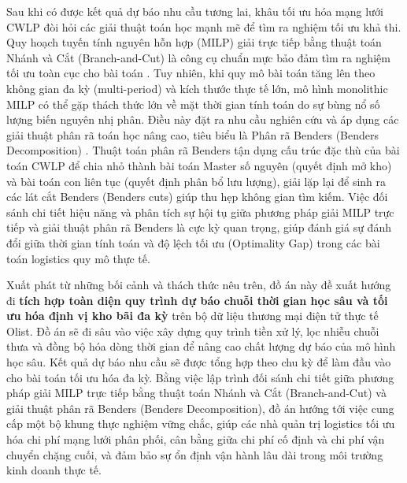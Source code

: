 Sau khi có được kết quả dự báo nhu cầu tương lai, khâu tối ưu hóa mạng lưới CWLP đòi hỏi các giải thuật toán học mạnh mẽ để tìm ra nghiệm tối ưu khả thi. Quy hoạch tuyến tính nguyên hỗn hợp (MILP) giải trực tiếp bằng thuật toán Nhánh và Cắt (Branch-and-Cut) là công cụ chuẩn mực bảo đảm tìm ra nghiệm tối ưu toàn cục cho bài toán \cite{milazzo2022}. Tuy nhiên, khi quy mô bài toán tăng lên theo không gian đa kỳ (multi-period) và kích thước thực tế lớn, mô hình monolithic MILP có thể gặp thách thức lớn về mặt thời gian tính toán do sự bùng nổ số lượng biến nguyên nhị phân. Điều này đặt ra nhu cầu nghiên cứu và áp dụng các giải thuật phân rã toán học nâng cao, tiêu biểu là Phân rã Benders (Benders Decomposition) \cite{sadatasl2021}. Thuật toán phân rã Benders tận dụng cấu trúc đặc thù của bài toán CWLP để chia nhỏ thành bài toán Master số nguyên (quyết định mở kho) và bài toán con liên tục (quyết định phân bổ lưu lượng), giải lặp lại để sinh ra các lát cắt Benders (Benders cuts) giúp thu hẹp không gian tìm kiếm. Việc đối sánh chi tiết hiệu năng và phân tích sự hội tụ giữa phương pháp giải MILP trực tiếp và giải thuật phân rã Benders là cực kỳ quan trọng, giúp đánh giá sự đánh đổi giữa thời gian tính toán và độ lệch tối ưu (Optimality Gap) trong các bài toán logistics quy mô thực tế.

Xuất phát từ những bối cảnh và thách thức nêu trên, đồ án này đề xuất hướng đi \textbf{tích hợp toàn diện quy trình dự báo chuỗi thời gian học sâu và tối ưu hóa định vị kho bãi đa kỳ} trên bộ dữ liệu thương mại điện tử thực tế Olist. Đồ án sẽ đi sâu vào việc xây dựng quy trình tiền xử lý, lọc nhiễu chuỗi thưa và đồng bộ hóa dòng thời gian để nâng cao chất lượng dự báo của mô hình học sâu. Kết quả dự báo nhu cầu sẽ được tổng hợp theo chu kỳ để làm đầu vào cho bài toán tối ưu hóa đa kỳ. Bằng việc lập trình đối sánh chi tiết giữa phương pháp giải MILP trực tiếp bằng thuật toán Nhánh và Cắt (Branch-and-Cut) và giải thuật phân rã Benders (Benders Decomposition), đồ án hướng tới việc cung cấp một bộ khung thực nghiệm vững chắc, giúp các nhà quản trị logistics tối ưu hóa chi phí mạng lưới phân phối, cân bằng giữa chi phí cố định và chi phí vận chuyển chặng cuối, và đảm bảo sự ổn định vận hành lâu dài trong môi trường kinh doanh thực tế.

